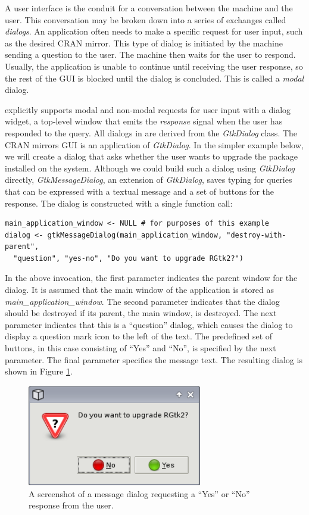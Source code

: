 \documentclass[article]{jss}
\begin{document}
A user interface is the conduit for a conversation between the machine and the
user. This conversation may be broken down into a series of exchanges called 
\emph{dialogs}. An application often needs to make a specific request
for user input, such as the desired CRAN mirror. This type of dialog is 
initiated by the machine sending a question to the user. The machine then
waits for the user to respond. Usually, the application is unable to continue
until receiving the user response, so the rest of the GUI is blocked until
the dialog is concluded. This is called a \emph{modal} dialog.

 explicitly supports modal and non-modal requests for user input with
a dialog widget, a top-level window that emits the \emph{response} signal
when the user has responded to the query. All dialogs in  are derived
from the \emph{GtkDialog} class. The CRAN mirrors GUI is an application
of \emph{GtkDialog}. In the simpler example below,
we will create a dialog that asks whether the user wants to upgrade the 
package installed on the system. Although we could build such a dialog using \emph{GtkDialog}
directly, \emph{GtkMessageDialog}, an extension of \emph{GtkDialog}, saves 
typing for queries that can be expressed with a textual message and a set
of buttons for the response. The dialog is constructed with a single function call:
\begin{verbatim}
main_application_window <- NULL # for purposes of this example
dialog <- gtkMessageDialog(main_application_window, "destroy-with-parent", 
  "question", "yes-no", "Do you want to upgrade RGtk2?")
\end{verbatim}
In the above invocation, the first parameter indicates the parent window for
the dialog. It is assumed that the main window of the application is stored 
as \emph{main\_application\_window}. The second parameter indicates that
the dialog should be destroyed if its parent, the main window, is destroyed.
The next parameter indicates that this is a ``question'' dialog, which causes
the dialog to display a question mark icon to the left of the text. The 
predefined set of buttons, in this case consisting of ``Yes'' and ``No'', 
is specified by the next parameter. The final parameter specifies the message text.
The resulting dialog is shown in Figure \ref{fig:upgrade-dialog}.

\begin{figure}
\begin{center}
\includegraphics[width=3in]{upgrade-dialog.png}
\caption{\label{fig:upgrade-dialog}A screenshot of a message dialog requesting a 
``Yes'' or ``No'' response from the user.}
\end{center}
\end{figure}
\end{document}
